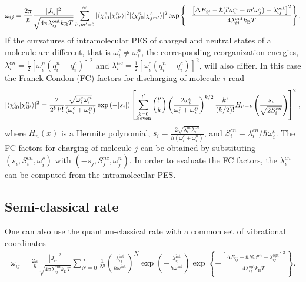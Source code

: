 \begin{eqnarray}
 \omega_{ij}= \frac{2\pi}{\hbar}  \frac{|J_{ij}|^2}{\sqrt{4\pi \lambda_{ij}^\text{out} k_\text{B}T}}
 \sum_{l',m'=0}^\infty
 |\langle \chi_{i0}^c |\chi_{il'}^n \rangle|^2 |\langle \chi_{j0}^n |\chi_{jm'}^c \rangle|^2
\exp
\left\{ -\frac{ \left[ \Delta E_{ij}-\hbar(l'\omega_i^n+m'\omega_j^c) -\lambda_{ij}^\text{out} \right]^2}{4\lambda_{ij}^\text{out} k_\text{B}T}
\right\} .
\label{equ:jjortner}
\end{eqnarray}
If the curvatures of intramolecular PES of charged and neutral states of a molecule are different, that is $\omega_i^c\neq\omega_i^n$, the corresponding reorganization energies, $\lambda_i^{cn}=\frac{1}{2}[\omega_i^n(q_i^n-q_i^c)]^2$ and $\lambda_i^{nc}=\frac{1}{2}[\omega_i^c(q_i^n-q_i^c)]^2$, will also differ. In this case the Franck-Condon (FC) factors for discharging of molecule $i$ read \cite{chang_new_2005}
\begin{align}
|\langle \chi_{i0}^c |\chi_{il'}^n \rangle|^2 =
\frac{2}{2^{l'}l'!} \frac{\sqrt{\omega_i^c\omega_i^n}}{(\omega_i^c+\omega_i^n)} \exp\left( -|s_i| \right)
 \left[ \sum_{\substack{k=0\\k\,\text{even}}}^{l'} {l' \choose k}
\left( \frac{2 \omega_i^c }{\omega_i^c+\omega_i^n}\right)^{k/2} \frac{k!}{(k/2)!}
H_{l'-k} \left( \frac{s_{i}}{\sqrt{2S^{cn}_i}}\right)
\right]^2
\, ,
\end{align}
where $H_n(x)$ is a Hermite polynomial, $s_i=\frac{2\sqrt{\lambda_i^{nc}\lambda_i^{cn}}}{\hbar(\omega_i^c+\omega_i^n)}$, and $S^{cn}_i=\lambda_i^{cn}/\hbar\omega_i^c$. The FC factors for charging of molecule $j$ can be obtained by substituting $(s_i,S^{cn}_i,\omega_i^c)$ with $(-s_j,S^{nc}_j, \omega_j^n)$. In order to evaluate the FC factors, the  $\lambda_i^{cn}$ can be computed from the intramolecular PES.

\subsection{Semi-classical rate}
\label{sec:rate_semiclassical}

One can also use the quantum-classical rate with a common set of vibrational coordinates~\cite{may_charge_2003}
\begin{align}
 \omega_{ij} = \frac{2\pi}{\hbar}  \frac{|J_{ij}|^2}{\sqrt{4\pi \lambda_{ij}^\text{out} k_\text{B}T}}
 \sum_{N=0}^\infty \frac{1}{N!} \left( \frac{\lambda_{ij}^\text{int}}{\hbar\omega^\text{int}} \right)^{N}
  \exp \left( - \frac{\lambda_{ij}^\text{int}}{\hbar\omega^\text{int}}\right)
\exp
\left\{ -\frac{ \left[ \Delta E_{ij}-\hbar N\omega^\text{int} -\lambda_{ij}^\text{out} \right]^2}{4\lambda_{ij}^\text{out} k_\text{B}T}
\right\} .
\label{equ:jortner}
\end{align}

